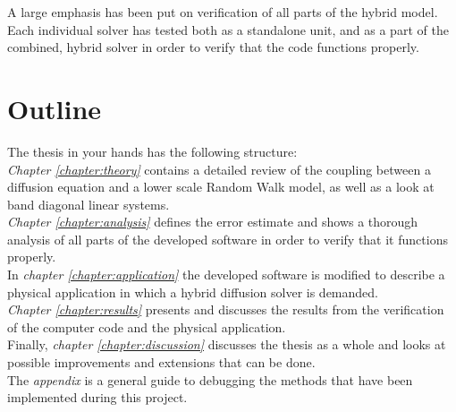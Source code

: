 \noindent A large emphasis has been put on verification of all parts of the hybrid model. 
Each individual solver has tested both as a standalone unit, and as a part of the combined, hybrid solver in order to verify that the code functions properly.

\section{Outline}
\noindent The thesis in your hands has the following structure: \\

\noindent \emph{Chapter \ref{chapter:theory}} contains a detailed review of the coupling between a diffusion equation and a lower scale Random Walk model, as well as a look at band diagonal linear systems. \\

\noindent \emph{Chapter \ref{chapter:analysis}} defines the error estimate and shows a thorough analysis of all parts of the developed software in order to verify that it functions properly. \\

\noindent In \emph{chapter \ref{chapter:application}} the developed software is modified to describe a physical application in which a hybrid diffusion solver is demanded. \\

\noindent \emph{Chapter \ref{chapter:results}} presents and discusses the results from the verification of the computer code and the physical application. \\

\noindent Finally, \emph{chapter \ref{chapter:discussion}} discusses the thesis as a whole and looks at possible improvements and extensions that can be done. \\

\noindent The \emph{appendix} is a general guide to debugging the methods that have been implemented during this project.